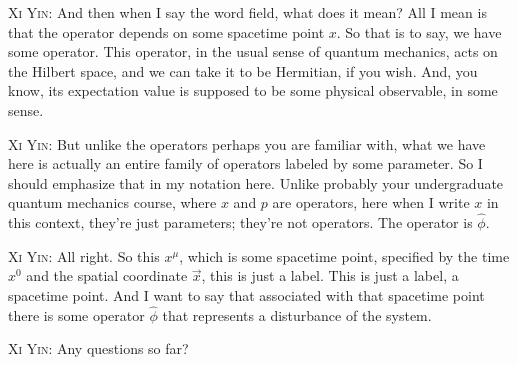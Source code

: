 \noindent\textsc{Xi Yin:} And then when I say the word field, what does it mean? All I mean is that the operator depends on some spacetime point $x$. So that is to say, we have some operator. This operator, in the usual sense of quantum mechanics, acts on the Hilbert space, and we can take it to be Hermitian, if you wish. And, you know, its expectation value is supposed to be some physical observable, in some sense.\par

\noindent\textsc{Xi Yin:} But unlike the operators perhaps you are familiar with, what we have here is actually an entire family of operators labeled by some parameter. So I should emphasize that in my notation here. Unlike probably your undergraduate quantum mechanics course, where $x$ and $p$ are operators, here when I write $x$ in this context, they're just parameters; they're not operators. The operator is $\hat\phi$.\par


\noindent\textsc{Xi Yin:} All right. So this $x^\mu$, which is some spacetime point, specified by the time $x^0$ and the spatial coordinate $\vec x$, this is just a label. This is just a label, a spacetime point. And I want to say that associated with that spacetime point there is some operator $\hat\phi$ that represents a disturbance of the system.\par

\noindent\textsc{Xi Yin:} Any questions so far?\par

